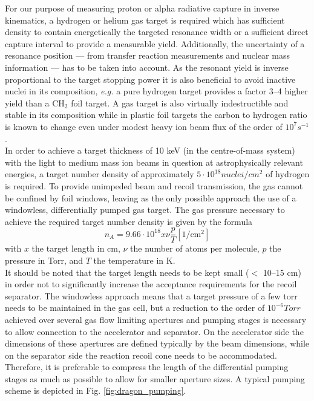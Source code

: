 For our purpose of measuring proton or alpha radiative capture in inverse kinematics, a hydrogen or helium gas target is required which has sufficient density  to contain energetically the targeted resonance width or a sufficient direct capture interval to provide a measurable yield. Additionally, the uncertainty of a resonance position --- from transfer reaction measurements and nuclear mass information --- has to be taken into account. As the resonant yield is inverse proportional to the target stopping power it is also beneficial to avoid inactive nuclei in its composition, {\it e.g.} a pure hydrogen target provides a factor 3--4 higher yield than a CH$_2$ foil target.  A gas target is also virtually indestructible and stable in its composition while in plastic foil targets the carbon to hydrogen ratio is known to change even under modest heavy ion beam flux of the order of $10^7 \unit{s^{-1}}$.\\
In order to achieve a target thickness of 10 keV (in the centre-of-mass system) with the light to medium mass ion beams in question at astrophysically relevant energies, a target number density of approximately $5\cdot10^{18} \unit{nuclei/cm^2}$ of hydrogen is required. To provide unimpeded beam and recoil transmission, the gas cannot be confined by foil windows, leaving as the only possible approach the use of a windowless, differentially pumped gas target. The gas pressure necessary to achieve the required target number density is given by the formula \cite{rolf88} 
\begin{equation}
n_A = 9.66\cdot10^{18} x \nu \frac{p}{T} \mathrm{[1/cm^2]}
\end{equation}
with $x$ the target length in cm, $\nu$ the number of atoms per molecule, $p$ the pressure in Torr, and $T$ the temperature in K.\\
It should be noted that the target length needs to be kept small ($<$ 10--15 cm) in order not to significantly increase the acceptance requirements for the recoil separator. The windowless approach means that a target pressure of a few torr needs to be maintained in the gas cell, but a reduction to the order of $10^{-6} \unit{Torr}$ achieved over several gas flow limiting apertures and pumping stages is necessary to allow connection to the accelerator and separator. On the accelerator side the dimensions of these apertures are defined typically by the beam dimensions, while on the separator side the reaction recoil cone needs to be accommodated. Therefore, it is preferable to compress the length of the differential pumping stages as much as possible to allow for smaller aperture sizes. A typical pumping scheme is depicted in Fig. \ref{fig:dragon_pumping}.
